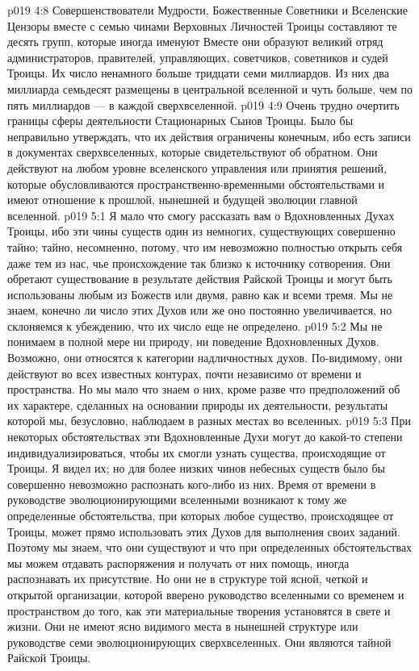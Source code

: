 \vs p019 4:8 \pc Совершенствователи Мудрости, Божественные Советники и Вселенские Цензоры вместе с семью чинами Верховных Личностей Троицы составляют те десять групп, которые иногда именуют  Вместе они образуют великий отряд администраторов, правителей, управляющих, советчиков, советников и судей Троицы. Их число ненамного больше тридцати семи миллиардов. Из них два миллиарда семьдесят размещены в центральной вселенной и чуть больше, чем по пять миллиардов --- в каждой сверхвселенной.
\vs p019 4:9 Очень трудно очертить границы сферы деятельности Стационарных Сынов Троицы. Было бы неправильно утверждать, что их действия ограничены конечным, ибо есть записи в документах сверхвселенных, которые свидетельствуют об обратном. Они действуют на любом уровне вселенского управления или принятия решений, которые обусловливаются пространственно\hyp{}временными обстоятельствами и имеют отношение к прошлой, нынешней и будущей эволюции главной вселенной.
\vs p019 5:1 Я мало что смогу рассказать вам о Вдохновленных Духах Троицы, ибо эти чины существ один из немногих, существующих совершенно тайно; тайно, несомненно, потому, что им невозможно полностью открыть себя даже тем из нас, чье происхождение так близко к источнику сотворения. Они обретают существование в результате действия Райской Троицы и могут быть использованы любым из Божеств или двумя, равно как и всеми тремя. Мы не знаем, конечно ли число этих Духов или же оно постоянно увеличивается, но склоняемся к убеждению, что их число еще не определено.
\vs p019 5:2 Мы не понимаем в полной мере ни природу, ни поведение Вдохновленных Духов. Возможно, они относятся к категории надличностных духов. По\hyp{}видимому, они действуют во всех известных контурах, почти независимо от времени и пространства. Но мы мало что знаем о них, кроме разве что предположений об их характере, сделанных на основании природы их деятельности, результаты которой мы, безусловно, наблюдаем в разных местах во вселенных.
\vs p019 5:3 При некоторых обстоятельствах эти Вдохновленные Духи могут до какой\hyp{}то степени индивидуализироваться, чтобы их смогли узнать существа, происходящие от Троицы. Я видел их; но для более низких чинов небесных существ было бы совершенно невозможно распознать кого\hyp{}либо из них. Время от времени в руководстве эволюционирующими вселенными возникают к тому же определенные обстоятельства, при которых любое существо, происходящее от Троицы, может прямо использовать этих Духов для выполнения своих заданий. Поэтому мы знаем, что они существуют и что при определенных обстоятельствах мы можем отдавать распоряжения и получать от них помощь, иногда распознавать их присутствие. Но они не в структуре той ясной, четкой и открытой организации, которой вверено руководство вселенными со временем и пространством до того, как эти материальные творения установятся в свете и жизни. Они не имеют ясно видимого места в нынешней структуре или руководстве семи эволюционирующих сверхвселенных. Они являются тайной Райской Троицы.
